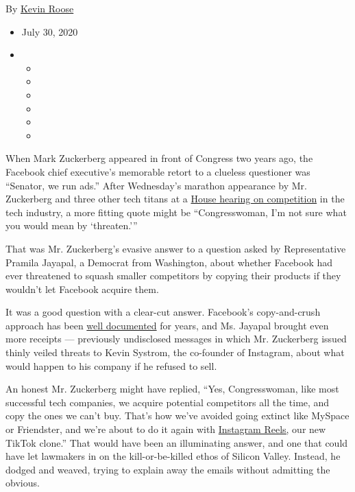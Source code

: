 By \href{https://www.nytimes3xbfgragh.onion/by/kevin-roose}{Kevin Roose}

\begin{itemize}
\item
  July 30, 2020
\item
  \begin{itemize}
  \item
  \item
  \item
  \item
  \item
  \item
  \end{itemize}
\end{itemize}

When Mark Zuckerberg appeared in front of Congress two years ago, the
Facebook chief executive's memorable retort to a clueless questioner was
``Senator, we run ads.'' After Wednesday's marathon appearance by Mr.
Zuckerberg and three other tech titans at a
\href{https://www.nytimes3xbfgragh.onion/2020/07/29/technology/big-tech-hearing-apple-amazon-facebook-google.html}{House
hearing on competition} in the tech industry, a more fitting quote might
be ``Congresswoman, I'm not sure what you would mean by `threaten.'''

That was Mr. Zuckerberg's evasive answer to a question asked by
Representative Pramila Jayapal, a Democrat from Washington, about
whether Facebook had ever threatened to squash smaller competitors by
copying their products if they wouldn't let Facebook acquire them.

It was a good question with a clear-cut answer. Facebook's
copy-and-crush approach has been
\href{https://www.wired.com/story/copycat-how-facebook-tried-to-squash-snapchat/}{well
documented} for years, and Ms. Jayapal brought even more receipts ---
previously undisclosed messages in which Mr. Zuckerberg issued thinly
veiled threats to Kevin Systrom, the co-founder of Instagram, about what
would happen to his company if he refused to sell.

An honest Mr. Zuckerberg might have replied, ``Yes, Congresswoman, like
most successful tech companies, we acquire potential competitors all the
time, and copy the ones we can't buy. That's how we've avoided going
extinct like MySpace or Friendster, and we're about to do it again with
\href{https://techcrunch.com/2020/07/16/instagram-confirms-its-tiktok-rival-reels-will-launch-in-the-us-in-early-august/}{Instagram
Reels,} our new TikTok clone.'' That would have been an illuminating
answer, and one that could have let lawmakers in on the
kill-or-be-killed ethos of Silicon Valley. Instead, he dodged and
weaved, trying to explain away the emails without admitting the obvious.

